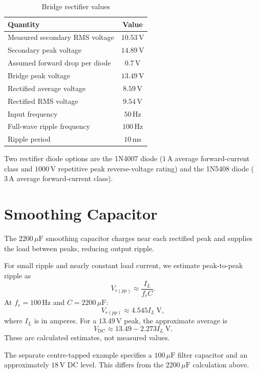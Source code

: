 \documentclass[journal,12pt,twocolumn]{IEEEtran}
\theoremstyle{definition}
\theoremstyle{remark}
\numberwithin{equation}{section}
\begin{document}
\begin{table}[H]
\centering
\caption{Bridge rectifier values}
\label{tab:bridge-values}
\small
\begin{tabular}{|p{}|c|}
\hline
\textbf{Quantity} & \textbf{Value}\\ \hline
Measured secondary RMS voltage & $10.53\,\mathrm{V}$\\
Secondary peak voltage & $14.89\,\mathrm{V}$\\
Assumed forward drop per diode & $0.7\,\mathrm{V}$\\
Bridge peak voltage & $13.49\,\mathrm{V}$\\
Rectified average voltage & $8.59\,\mathrm{V}$\\
Rectified RMS voltage & $9.54\,\mathrm{V}$\\
Input frequency & $50\,\mathrm{Hz}$\\
Full-wave ripple frequency & $100\,\mathrm{Hz}$\\
Ripple period & $10\,\mathrm{ms}$\\
\hline
\end{tabular}
\end{table}

Two rectifier diode options are the 1N4007 diode
($1\,\mathrm{A}$ average forward-current class and
$1000\,\mathrm{V}$ repetitive peak reverse-voltage rating) and
the 1N5408 diode ($3\,\mathrm{A}$ average forward-current class).

\FloatBarrier
\section{Smoothing Capacitor}
The $2200\,\mu\mathrm{F}$ smoothing capacitor charges near each
rectified peak and supplies the load between peaks, reducing output
ripple.

For small ripple and nearly constant load current, we estimate
peak-to-peak ripple as
\[
V_{r(pp)}\approx\frac{I_L}{f_rC}.
\]
At $f_r=100\,\mathrm{Hz}$ and $C=2200\,\mu\mathrm{F}$:
\[
V_{r(pp)}\approx4.545 I_L\ \mathrm{V},
\]
where $I_L$ is in amperes. For a $13.49\,\mathrm{V}$ peak, the
approximate average is
\[
V_{\mathrm{DC}}\approx13.49-2.273I_L\ \mathrm{V}.
\]
These are calculated estimates, not measured values.

The separate centre-tapped example specifies a $100\,\mu\mathrm{F}$
filter capacitor and an approximately $18\,\mathrm{V}$ DC level.
This differs from the $2200\,\mu\mathrm{F}$ calculation above.

\FloatBarrier
{}
\end{document}
